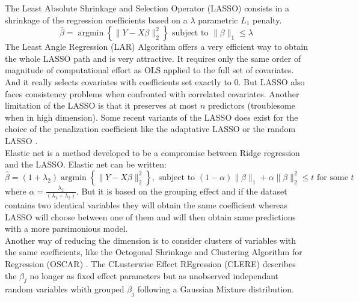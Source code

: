 \documentclass[11pt,a4paper]{article}
\begin{document}
	
	The Least Absolute Shrinkage and Selection Operator (LASSO)\cite{tibshirani1996regression} consists in a shrinkage of the regression coefficients based on a $\lambda$ parametric $L_1$ penalty.
		\begin{equation}
		 \hat{\beta}=\operatorname{argmin} \left\lbrace \parallel Y-X\beta\parallel_2^2 \right\rbrace \textrm{ subject to } \parallel\beta\parallel_1\leq \lambda
		\end{equation}	
	 The Least Angle Regression\cite{efron2004least} (LAR) Algorithm offers a very efficient way to obtain the whole LASSO path and is very attractive. It requires only the same order of magnitude of computational effort as OLS applied to the full set of covariates. And it  really selects covariates with coefficients set exactly to 0.
	 But LASSO also faces consistency problems \cite{Zhao2006MSC} when confronted  with correlated covariates. Another limitation of the LASSO is that it preserves at most $n$ predictors (troublesome when in high dimension). Some recent variants of the LASSO does exist for the choice of the penalization coefficient like the adaptative LASSO \cite{zou2006adaptive} or the random LASSO \cite{wang2011random}.
	 \\
	 
	Elastic net\cite{zou2005regularization}	is a method developed to be a compromise between Ridge regression and the LASSO. 
	Elastic net can be written:
	\begin{equation}
		\hat{\beta}=(1+\lambda_2) \operatorname{argmin}\left\lbrace \parallel Y-X\beta \parallel_2^2 \right\rbrace, \textrm{ subject to } (1-\alpha)\parallel\beta\parallel_1+\alpha\parallel\beta\parallel_2^2\leq t \textrm{ for some } t
	\end{equation}
	where $\alpha=\frac{\lambda_2}{(\lambda_1+\lambda_2)}$. 
	But it is based on the grouping effect and if the dataset contains two identical variables they will obtain the same coefficient whereas LASSO will choose between one of them and will then obtain same predictions with a more parsimonious model. 
	\\
	
	Another way of reducing the dimension is to consider clusters of variables with the same coefficients, like the Octogonal Shrinkage and Clustering Algorithm for Regression (OSCAR) \cite{bondell2008simultaneous}.
	The CLusterwise Effect REgression\cite{yengo2012variable} (CLERE) describes the $\beta_j$ no longer as fixed effect parameters but as unobserved independant random variables whith grouped $\beta_j$ following a Gaussian Mixture distribution. 
\end{document}
